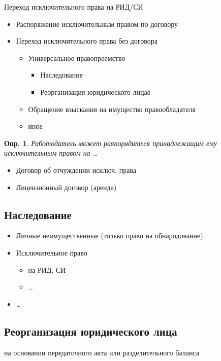 \documentclass[12pt]{article}
\newtheorem{definition}{Опр.}
\begin{document}
Переход исключительного права на РИД/СИ
\begin{itemize}
  \item Распоряжение исключительным правом по договору
  \item Переход исключительного права без договора
  \begin{itemize}
    \item Универсальное правопреемство
    \begin{itemize}
      \item Наследование
      \item Реорганизация юридического лицаё
    \end{itemize}
    \item Обращение взыскания на имущество правообладателя
    \item иное
  \end{itemize}
\end{itemize}

\begin{definition}
  Работодатель может раяпорядиться принадлежащим ему исключительным правом на \dots
\end{definition}

\begin{itemize}
  \item Договор об отчуждении исключ. права
  \item Лицензионный договор (аренда)
\end{itemize}

\subsection{Наследование}
\begin{itemize}
  \item Личные неимущественные (только право на обнародование)
  \item Исключительное право
  \begin{itemize}
    \item на РИД, СИ
    \item \dots
  \end{itemize}
  \item \dots
\end{itemize}

\subsection{Реорганизация юридического лица}

на основании передаточного акта или разделительного баланса
\end{document}
